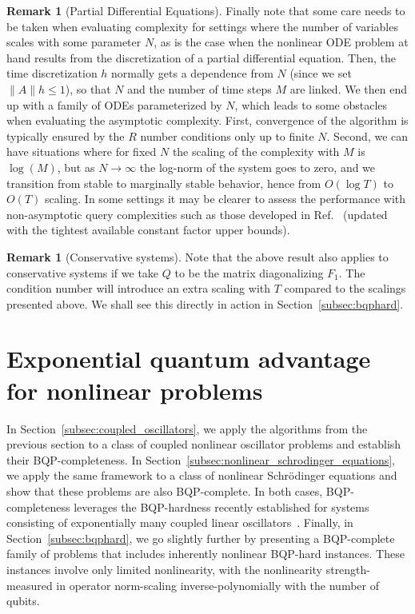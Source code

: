 \documentclass[superscriptaddress,onecolumn,nofootinbib,longbibliography,a4paper,accepted=2026-09-29]{quantumarticle}
\theoremstyle{plain}
\theoremstyle{definition}
\newtheorem{rmk}[thm]{Remark}
\numberwithin{thm}{section}
\numberwithin{assumption}{section}
\numberwithin{lemma}{section}
\numberwithin{prop}{section}
\numberwithin{cor}{section}
\numberwithin{definition}{section}
\numberwithin{rmk}{section}
\numberwithin{equation}{section}
\begin{document}
\begin{rmk}[Partial Differential Equations]
    Finally note that some care needs to be taken when evaluating complexity for settings where the number of variables scales with some parameter $N$, as is the case when the nonlinear ODE problem at hand results from the discretization of a partial differential equation. Then, the time discretization $h$ normally gets a dependence from $N$ (since we set $\|A\| h \leq 1$), so that $N$ and the number of time steps $M$ are linked. We then end up with a family of ODEs parameterized by $N$, which leads to some obstacles when evaluating the asymptotic complexity. First, convergence of the algorithm is typically ensured by the $R$ number conditions only up to finite $N$. Second, we can have situations where for fixed $N$ the scaling of the complexity with $M$ is $\log(M)$, but as $N \rightarrow \infty$ the log-norm of the system goes to zero, and we transition from stable to marginally stable behavior, hence from $O(\log T)$ to $O(T)$ scaling. In some settings it may be clearer to assess the performance with non-asymptotic query complexities such as those developed in Ref.~\cite{jennings2023cost} (updated with the tightest available constant factor upper bounds).
\end{rmk}

\begin{rmk}[Conservative systems]
    Note that the above result also applies to conservative systems if we take $Q$ to be the matrix diagonalizing $F_1$. The condition number will introduce an extra scaling with $T$ compared to the scalings presented above. We shall see this directly in action in Section~\ref{subsec:bqphard}.
\end{rmk}


\newpage 

\section{Exponential quantum advantage for nonlinear problems}
\label{sec:exponential_quantum_advantage}

In Section~\ref{subsec:coupled_oscillators}, we apply the algorithms from the previous section to a class of coupled nonlinear oscillator problems and establish their BQP-completeness. In Section~\ref{subsec:nonlinear_schrodinger_equations}, we apply the same framework to a class of nonlinear Schr\"{o}dinger equations and show that these problems are also BQP-complete. In both cases, BQP-completeness leverages the BQP-hardness recently established for systems consisting of exponentially many coupled linear oscillators~\cite{babbush2023exponential}. Finally, in Section~\ref{subsec:bqphard}, we go slightly further by presenting a BQP-complete family of problems that includes inherently nonlinear BQP-hard instances. These instances involve only limited nonlinearity, with the nonlinearity strength-measured in operator norm-scaling inverse-polynomially with the number of qubits.
\end{document}
